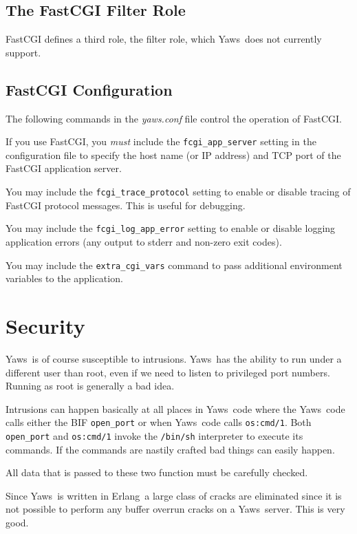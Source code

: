 \documentclass[11pt,oneside,english]{book}
\newcommand{\Erlang}            %
        {{\sc Erlang}}
\newcommand{\Yaws}            %
        {{\sc Yaws}}
\begin{document}
\section{The FastCGI Filter Role}

FastCGI defines a third role, the filter role, which
\Yaws\  does not currently support.


\section{FastCGI Configuration}

The following commands in the \textit{yaws.conf} file control the
operation of FastCGI.

If you use FastCGI, you \emph{must} include the \verb+fcgi_app_server+
setting in the configuration file to specify the host name (or IP address)
and TCP port of the FastCGI application server.

You may include the \verb+fcgi_trace_protocol+ setting to enable or disable
tracing of FastCGI protocol messages. This is useful for debugging.

You may include the \verb+fcgi_log_app_error+ setting to enable or disable
logging application errors (any output to stderr and non-zero exit codes).

You may include the \verb+extra_cgi_vars+ command to pass additional
environment variables to the application.


\chapter{Security}

\Yaws\  is of course susceptible to intrusions. \Yaws\  has the
ability to run under a different user than root, even if we need
to listen to privileged port numbers. Running as root is generally a
bad idea.

Intrusions can happen basically at all places in \Yaws\ code where the
\Yaws\ code calls either the BIF \verb+open_port+ or when \Yaws\ code
calls \verb+os:cmd/1+. Both \verb+open_port+ and \verb+os:cmd/1+
invoke the \verb+/bin/sh+ interpreter to execute its commands. If the
commands are nastily crafted bad things can easily happen.

All data that is passed to these two function must be carefully
checked.

Since \Yaws\  is written in \Erlang\  a large class of cracks are
eliminated since it is not possible to perform any buffer overrun
cracks on a \Yaws\  server. This is very good.
\end{document}
